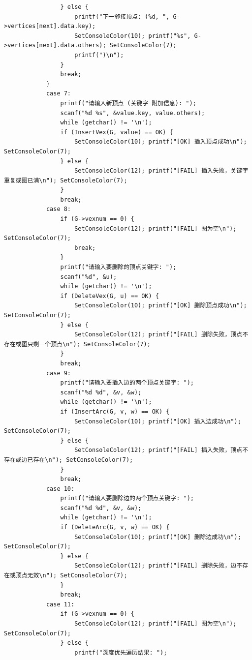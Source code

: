 \documentclass[supercite]{Experimental_Report}
\begin{document}
{\begin{lstlisting}
                } else {
                    printf("下一邻接顶点: (%d, ", G->vertices[next].data.key);
                    SetConsoleColor(10); printf("%s", G->vertices[next].data.others); SetConsoleColor(7);
                    printf(")\n");
                }
                break;
            }
            case 7:
                printf("请输入新顶点 (关键字 附加信息): ");
                scanf("%d %s", &value.key, value.others);
                while (getchar() != '\n');
                if (InsertVex(G, value) == OK) {
                    SetConsoleColor(10); printf("[OK] 插入顶点成功\n"); SetConsoleColor(7);
                } else {
                    SetConsoleColor(12); printf("[FAIL] 插入失败，关键字重复或图已满\n"); SetConsoleColor(7);
                }
                break;
            case 8:
                if (G->vexnum == 0) {
                    SetConsoleColor(12); printf("[FAIL] 图为空\n"); SetConsoleColor(7);
                    break;
                }
                printf("请输入要删除的顶点关键字: ");
                scanf("%d", &u);
                while (getchar() != '\n');
                if (DeleteVex(G, u) == OK) {
                    SetConsoleColor(10); printf("[OK] 删除顶点成功\n"); SetConsoleColor(7);
                } else {
                    SetConsoleColor(12); printf("[FAIL] 删除失败，顶点不存在或图只剩一个顶点\n"); SetConsoleColor(7);
                }
                break;
            case 9:
                printf("请输入要插入边的两个顶点关键字: ");
                scanf("%d %d", &v, &w);
                while (getchar() != '\n');
                if (InsertArc(G, v, w) == OK) {
                    SetConsoleColor(10); printf("[OK] 插入边成功\n"); SetConsoleColor(7);
                } else {
                    SetConsoleColor(12); printf("[FAIL] 插入失败，顶点不存在或边已存在\n"); SetConsoleColor(7);
                }
                break;
            case 10:
                printf("请输入要删除边的两个顶点关键字: ");
                scanf("%d %d", &v, &w);
                while (getchar() != '\n');
                if (DeleteArc(G, v, w) == OK) {
                    SetConsoleColor(10); printf("[OK] 删除边成功\n"); SetConsoleColor(7);
                } else {
                    SetConsoleColor(12); printf("[FAIL] 删除失败，边不存在或顶点无效\n"); SetConsoleColor(7);
                }
                break;
            case 11:
                if (G->vexnum == 0) {
                    SetConsoleColor(12); printf("[FAIL] 图为空\n"); SetConsoleColor(7);
                } else {
                    printf("深度优先遍历结果: ");

\end{lstlisting}}
\end{document}
